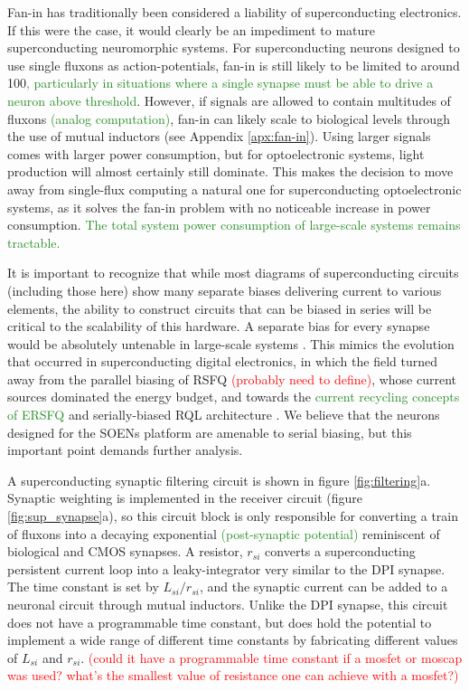\documentclass[twocolumn]{article}
\begin{document}
Fan-in has traditionally been considered a liability of superconducting electronics. If this were the case, it would clearly be an impediment to mature superconducting neuromorphic systems. For superconducting neurons designed to use single fluxons as action-potentials, fan-in is still likely to be limited to around 100\cite{schneider2020fan}\textcolor{ForestGreen}{, particularly in situations where a single synapse must be able to drive a neuron above threshold}. However, if signals are allowed to contain multitudes of fluxons \textcolor{ForestGreen}{(analog computation)}, fan-in can likely scale to biological levels through the use of mutual inductors (see Appendix \ref{apx:fan-in}). Using larger signals comes with larger power consumption, but for optoelectronic systems, light production will almost certainly still dominate. This makes the decision to move away from single-flux computing a natural one for superconducting optoelectronic systems, as it solves the fan-in problem with no noticeable increase in power consumption. \textcolor{ForestGreen}{The total system power consumption of large-scale systems remains tractable.}

It is important to recognize that while most diagrams of superconducting circuits (including those here) show many separate biases delivering current to various elements, the ability to construct circuits that can be biased in series will be critical to the scalability of this hardware. A separate bias for every synapse would be absolutely untenable in large-scale systems \cite{sergey}. This mimics the evolution that occurred in superconducting digital electronics, in which the field turned away from the parallel biasing of RSFQ \textcolor{red}{(probably need to define)}, whose current sources dominated the energy budget, and towards the \textcolor{ForestGreen}{current recycling concepts of ERSFQ \cite{}} and serially-biased RQL architecture \cite{tolpygo2016superconductor}. We believe that the neurons designed for the SOENs platform are amenable to serial biasing, but this important point demands further analysis.

A superconducting synaptic filtering circuit is shown in figure \ref{fig:filtering}a. Synaptic weighting is implemented in the receiver circuit (figure \ref{fig:sup_synapse}a), so this circuit block is only responsible for converting a train of fluxons into a decaying exponential \textcolor{ForestGreen}{(post-synaptic potential)} reminiscent of biological and CMOS synapses. A resistor, $r_{si}$ converts a superconducting persistent current loop into a leaky-integrator very similar to the DPI synapse. The time constant is set by $L_{si}/r_{si}$, and the synaptic current can be added to a neuronal circuit through mutual inductors. Unlike the DPI synapse, this circuit does not have a programmable time constant, but does hold the potential to implement a wide range of different time constants by fabricating different values of $L_{si}$ and $r_{si}$. \textcolor{red}{(could it have a programmable time constant if a mosfet or moscap was used? what's the smallest value of resistance one can achieve with a mosfet?)}
\end{document}
